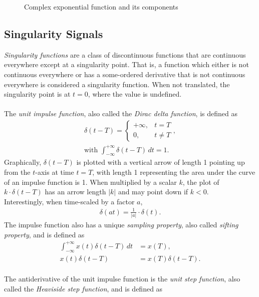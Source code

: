 \documentclass{report}
\begin{document}
\begin{figure}[hbt!]
    \caption{Complex exponential function and its components}
    \resizebox{\textwidth}{!}{%
        
    }
\end{figure}

\subsection{Singularity Signals}
\emph{Singularity functions} are a class of discontinuous functions that are continuous everywhere except at a singularity point. That is, a function which either is not continuous everywhere 
or has a some-ordered derivative that is not continuous everywhere is considered a singularity function. 
When not translated, the singularity point is at $t=0$, where the value is undefined. 
\\ \\
The \emph{unit impulse function}, also called the \emph{Dirac delta function}, is defined as 
\begin{align}
    \delta(t-T) = 
    \begin{cases} 
        +\infty, & t=T \\
        0, & t \neq T
    \end{cases}, \\
    \text{with } \int_{-\infty}^{+\infty} \delta(t-T) \,dt = 1.
\end{align}
Graphically, $\delta(t-T)$ is plotted with a vertical arrow of length 1 pointing up from the $t$-axis at time $t=T$, with length 1 representing the area under the curve of an impulse 
function is 1. When multiplied by a scalar $k$, the plot of $k\cdot\delta(t-T)$ has an arrow length $|k|$ and may point down if $k<0$. \\
Interestingly, when time-scaled by a factor $a$, 
\begin{align}
    \delta(at) = \frac{1}{|a|}\cdot \delta(t).
\end{align}
The impulse function also has a unique \emph{sampling property}, also called \emph{sifting property}, and is defined as
\begin{align}
    \int_{-\infty}^{+\infty} x(t)\delta(t-T) \,dt &= x(T), \\
    x(t)\delta(t-T) &= x(T)\delta(t-T).
\end{align} \\
The antiderivative of the unit impulse function is the \emph{unit step function}, also called the \emph{Heaviside step function}, and is defined as 
\end{document}
